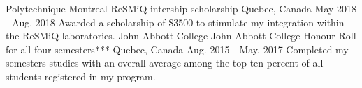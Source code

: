 \begin{cventries}
\cventry
    {Polytechnique Montreal}
    {ReSMiQ intership scholarship}
    {Quebec, Canada}
    {May 2018 - Aug. 2018}
    {
      {Awarded a scholarship of \$3500 to stimulate my integration within the  ReSMiQ laboratories.}  
    }
  \cventry
    {John Abbott College}
    {John Abbott College Honour Roll for all four semesters***}
    {Quebec, Canada}
    {Aug. 2015 - May. 2017}
    {
      {Completed my semesters
studies with an overall average among the top
ten percent of all students registered in my
program.}  
    }
\end{cventries}